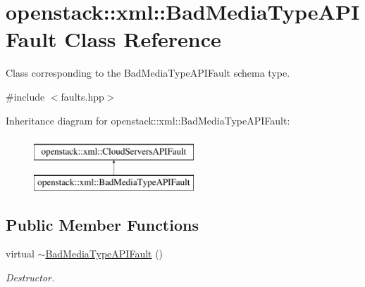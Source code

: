 \hypertarget{classopenstack_1_1xml_1_1BadMediaTypeAPIFault}{
\section{openstack::xml::BadMediaTypeAPIFault Class Reference}
\label{classopenstack_1_1xml_1_1BadMediaTypeAPIFault}
}


Class corresponding to the BadMediaTypeAPIFault schema type.  




{\ttfamily \#include $<$faults.hpp$>$}

Inheritance diagram for openstack::xml::BadMediaTypeAPIFault:\begin{figure}[H]
\begin{center}
\leavevmode
\includegraphics[height=2.000000cm]{classopenstack_1_1xml_1_1BadMediaTypeAPIFault}
\end{center}
\end{figure}
\subsection*{Public Member Functions}
\begin{DoxyCompactItemize}
\item 
\hypertarget{classopenstack_1_1xml_1_1BadMediaTypeAPIFault_afd0cf7f59bbed6f967599546b0aeae9c}{
virtual \hyperlink{classopenstack_1_1xml_1_1BadMediaTypeAPIFault_afd0cf7f59bbed6f967599546b0aeae9c}{$\sim$BadMediaTypeAPIFault} ()}
\label{classopenstack_1_1xml_1_1BadMediaTypeAPIFault_afd0cf7f59bbed6f967599546b0aeae9c}

\begin{DoxyCompactList}\small\item\em Destructor. \item\end{DoxyCompactList}\end{DoxyCompactItemize}
